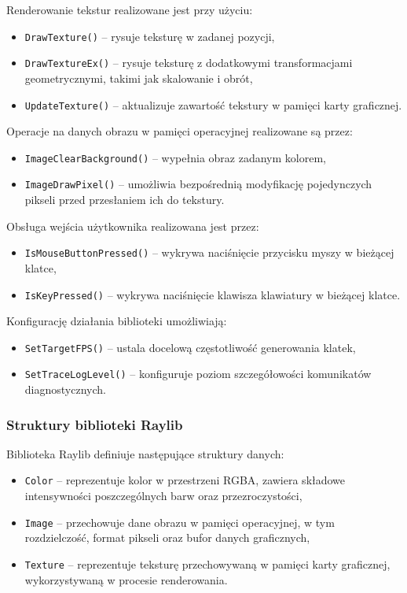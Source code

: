 \documentclass{article}
\begin{document}
Renderowanie tekstur realizowane jest przy użyciu:
\begin{itemize}
	\item \texttt{DrawTexture()} -- rysuje teksturę w zadanej pozycji,
	\item \texttt{DrawTextureEx()} -- rysuje teksturę z dodatkowymi transformacjami geometrycznymi,
	takimi jak skalowanie i obrót,
	\item \texttt{UpdateTexture()} -- aktualizuje zawartość tekstury w pamięci karty graficznej.
\end{itemize}

Operacje na danych obrazu w pamięci operacyjnej realizowane są przez:
\begin{itemize}
	\item \texttt{ImageClearBackground()} -- wypełnia obraz zadanym kolorem,
	\item \texttt{ImageDrawPixel()} -- umożliwia bezpośrednią modyfikację pojedynczych pikseli
	przed przesłaniem ich do tekstury.
\end{itemize}

Obsługa wejścia użytkownika realizowana jest przez:
\begin{itemize}
	\item \texttt{IsMouseButtonPressed()} -- wykrywa naciśnięcie przycisku myszy w bieżącej klatce,
	\item \texttt{IsKeyPressed()} -- wykrywa naciśnięcie klawisza klawiatury w bieżącej klatce.
\end{itemize}

Konfigurację działania biblioteki umożliwiają:
\begin{itemize}
	\item \texttt{SetTargetFPS()} -- ustala docelową częstotliwość generowania klatek,
	\item \texttt{SetTraceLogLevel()} -- konfiguruje poziom szczegółowości komunikatów diagnostycznych.
\end{itemize}

\subsubsection{Struktury biblioteki Raylib}

Biblioteka Raylib definiuje następujące struktury danych:
\begin{itemize}
	\item \texttt{Color} -- reprezentuje kolor w przestrzeni RGBA, zawiera składowe
	intensywności poszczególnych barw oraz przezroczystości,
	\item \texttt{Image} -- przechowuje dane obrazu w pamięci operacyjnej, w tym rozdzielczość,
	format pikseli oraz bufor danych graficznych,
	\item \texttt{Texture} -- reprezentuje teksturę przechowywaną w pamięci karty graficznej,
	wykorzystywaną w procesie renderowania.
\end{itemize}
\end{document}
